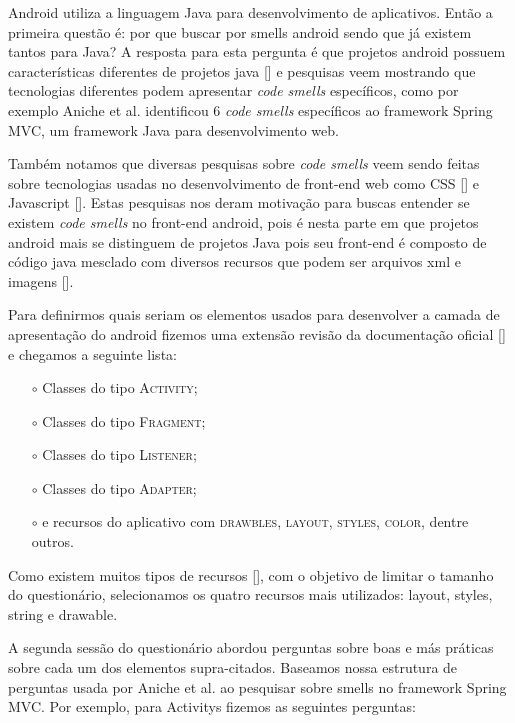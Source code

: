 Android utiliza a linguagem Java para desenvolvimento de aplicativos. Ent\~ao a primeira quest\~ao \'e: por que buscar por smells android sendo que j\'a existem tantos para Java? A resposta para esta pergunta \'e que projetos android possuem caracter\'isticas diferentes de projetos java [] e pesquisas veem mostrando que tecnologias diferentes podem apresentar \textit{code smells} espec\'ificos, como por exemplo Aniche et al. identificou 6 \textit{code smells} espec\'ificos ao framework Spring MVC, um framework Java para desenvolvimento web. 

Tamb\'em notamos que diversas pesquisas sobre \textit{code smells} veem sendo feitas sobre tecnologias usadas no desenvolvimento de front-end web como CSS [] e Javascript []. Estas pesquisas nos deram motiva\c{c}\~ao para buscas entender se existem \textit{code smells} no front-end android, pois \'e nesta parte em que projetos android mais se distinguem de projetos Java pois seu front-end \'e composto de c\'odigo java mesclado com diversos recursos que podem ser arquivos xml e imagens [].

Para definirmos quais seriam os elementos usados para desenvolver a camada de apresenta\c{c}\~ao do android fizemos uma extens\~ao revis\~ao da documenta\c{c}\~ao oficial [] e chegamos a seguinte lista:

\begin{itemize} 
	\item[$\circ$] Classes do tipo \textsc{Activity};
	\item[$\circ$] Classes do tipo \textsc{Fragment};
	\item[$\circ$] Classes do tipo \textsc{Listener};
	\item[$\circ$] Classes do tipo \textsc{Adapter};
	\item[$\circ$] e recursos do aplicativo com \textsc{drawbles}, \textsc{layout}, \textsc{styles}, \textsc{color}, dentre outros.
\end{itemize}

Como existem muitos tipos de recursos [], com o objetivo de limitar o tamanho do question\'ario, selecionamos os quatro recursos mais utilizados: layout, styles, string e drawable.

A segunda sess\~ao do question\'ario abordou perguntas sobre boas e m\'as pr\'aticas sobre cada um dos elementos supra-citados. Baseamos nossa estrutura de perguntas usada por Aniche et al. ao pesquisar sobre smells no framework Spring MVC. Por exemplo, para Activitys fizemos as seguintes perguntas: \\

